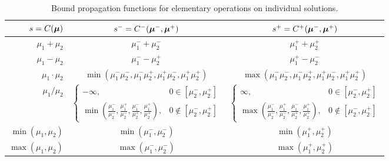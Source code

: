 \documentclass{article}[12pt]
\begin{document}
\begin{table}[H]
\begin{tabular}{r  c  c}
    $s=C(\boldsymbol{\mu})$ & $s^- = C^-(\boldsymbol{\mu}^-,\boldsymbol{\mu}^+)$ & $s^+ = C^+(\boldsymbol{\mu}^-,\boldsymbol{\mu}^+)$ \\
    \hline
    $\mu_1+\mu_2$ & $\mu_1^-+\mu_2^-$ & $\mu_1^++\mu_2^+$ \\
    $\mu_1-\mu_2$ & $\mu_1^--\mu_2^+$ & $\mu_1^+-\mu_2^-$ \\
    $\mu_1 \cdot \mu_2$ & $\min(\mu_1^-\mu_2^-,\mu_1^-\mu_2^+,\mu_1^+\mu_2^-,\mu_1^+\mu_2^+)$ & $\max(\mu_1^-\mu_2^-,\mu_1^-\mu_2^+,\mu_1^+\mu_2^-,\mu_1^+\mu_2^+)$ \\
    $\mu_1 / \mu_2$ & $\begin{cases} -\infty, & 0 \in [\mu_2^-,\mu_2^+] \\ \min\left(\frac{\mu_1^-}{\mu_2^-},\frac{\mu_1^+}{\mu_2^-},\frac{\mu_1^-}{\mu_2^+},\frac{\mu_1^+}{\mu_2^+}\right), & 0 \notin [\mu_2^-,\mu_2^+] \end{cases}$ & $\begin{cases} \infty, & 0 \in [\mu_2^-,\mu_2^+] \\ \max\left(\frac{\mu_1^-}{\mu_2^-},\frac{\mu_1^+}{\mu_2^-},\frac{\mu_1^-}{\mu_2^+},\frac{\mu_1^+}{\mu_2^+}\right), & 0 \notin [\mu_2^-,\mu_2^+] \end{cases}$ \\
    $\min(\mu_1,\mu_2)$ & $\min(\mu_1^-,\mu_2^-)$ & $\min(\mu_1^+,\mu_2^+)$ \\
    $\max(\mu_1,\mu_2)$ & $\max(\mu_1^-,\mu_2^-)$ & $\max(\mu_1^+,\mu_2^+)$ \\
    \hline
\end{tabular}
\caption{Bound propagation functions for elementary operations on individual solutions.}
\label{table:elementary_ops_Cpm}
\end{table}
\end{document}
